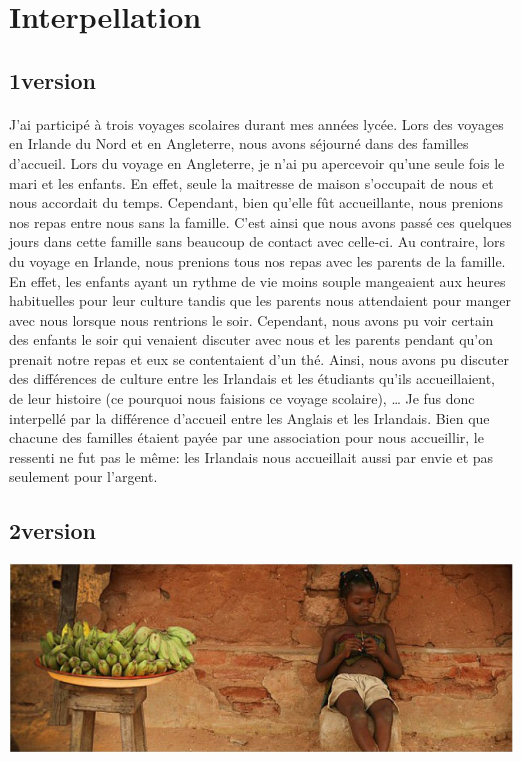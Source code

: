 \section{Interpellation}
\subsection{1\iere version}

\paragraph{} J'ai participé à trois voyages scolaires durant mes années lycée.
Lors des voyages en Irlande du Nord et en Angleterre, nous avons séjourné dans
des familles d'accueil. Lors du voyage en Angleterre, je n'ai pu apercevoir
qu'une seule fois le mari et les enfants. En effet, seule la maitresse de
maison s'occupait de nous et nous accordait du temps. Cependant, bien qu'elle
fût accueillante, nous prenions nos repas entre nous sans la famille. C'est
ainsi que nous avons passé ces quelques jours dans cette famille sans beaucoup
de contact avec celle-ci. Au contraire, lors du voyage en Irlande, nous
prenions tous nos repas avec les parents de la famille. En effet, les enfants
ayant un rythme de vie moins souple mangeaient aux heures habituelles pour leur
culture tandis que les parents nous attendaient pour manger avec nous lorsque
nous rentrions le soir. Cependant, nous avons pu voir certain des enfants le
soir qui venaient discuter avec nous et les parents pendant qu'on prenait notre
repas et eux se contentaient d'un thé. Ainsi, nous avons pu discuter des
différences de culture entre les Irlandais et les étudiants qu'ils
accueillaient, de leur histoire (ce pourquoi nous faisions ce voyage scolaire),
… Je fus donc interpellé par la différence d'accueil entre les Anglais et les
Irlandais. Bien que chacune des familles étaient payée par une association pour
nous accueillir, le ressenti ne fut pas le même: les Irlandais nous accueillait
aussi par envie et pas seulement pour l'argent.

\subsection{2\ieme version}

\begin{center}
	\includegraphics[scale=0.7]{Afrique.jpg}
\end{center}

